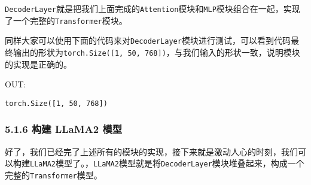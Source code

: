 \documentclass[12pt,a4paper]{book}
\begin{document}
\texttt{DecoderLayer}就是把我们上面完成的\texttt{Attention}模块和\texttt{MLP}模块组合在一起，实现了一个完整的\texttt{Transformer}模块。

同样大家可以使用下面的代码来对\texttt{DecoderLayer}模块进行测试，可以看到代码最终输出的形状为\texttt{torch.Size({[}1,\ 50,\ 768{]})}，与我们输入的形状一致，说明模块的实现是正确的。

\begin{Shaded}
\begin{Highlighting}[]
\OperatorTok{=}

\OperatorTok{=}
\OperatorTok{=} 

\OperatorTok{=}

\OperatorTok{=}\OperatorTok{//}

\OperatorTok{=}

\end{Highlighting}
\end{Shaded}

OUT:

\begin{verbatim}
torch.Size([1, 50, 768])
\end{verbatim}

\subsubsection{5.1.6 构建 LLaMA2
模型}\label{ux6784ux5efa-llama2-ux6a21ux578b}

好了，我们已经完了上述所有的模块的实现，接下来就是激动人心的时刻，我们可以构建\texttt{LLaMA2}模型了。，\texttt{LLaMA2}模型就是将\texttt{DecoderLayer}模块堆叠起来，构成一个完整的\texttt{Transformer}模型。
\end{document}

